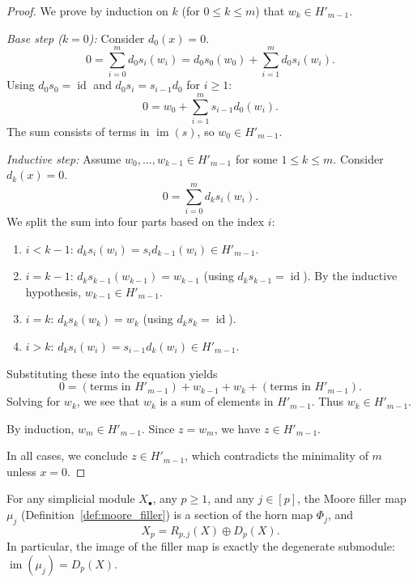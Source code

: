 \begin{proof}
We prove by induction on $k$ (for $0 \le k \le m$) that $w_k \in H'_{m-1}$.

\emph{Base step ($k=0$):} Consider $d_0(x)=0$.
\[
0 = \sum_{i=0}^m d_0 s_i(w_i) = d_0 s_0(w_0) + \sum_{i=1}^m d_0 s_i(w_i).
\]
Using $d_0 s_0 = \operatorname{id}$ and $d_0 s_i = s_{i-1} d_0$ for $i \ge 1$:
\[
0 = w_0 + \sum_{i=1}^m s_{i-1} d_0(w_i).
\]
The sum consists of terms in $\operatorname{im}(s)$, so $w_0 \in H'_{m-1}$.

\emph{Inductive step:} Assume $w_0, \dots, w_{k-1} \in H'_{m-1}$ for some $1 \le k \le m$. Consider $d_k(x)=0$.
\[
0 = \sum_{i=0}^m d_k s_i(w_i).
\]
We split the sum into four parts based on the index $i$:
\begin{enumerate}
    \item $i < k-1$: $d_k s_i(w_i) = s_i d_{k-1}(w_i) \in H'_{m-1}$.
    \item $i = k-1$: $d_k s_{k-1}(w_{k-1}) = w_{k-1}$ (using $d_k s_{k-1} = \operatorname{id}$). By the inductive hypothesis, $w_{k-1} \in H'_{m-1}$.
    \item $i = k$: $d_k s_k(w_k) = w_k$ (using $d_k s_k = \operatorname{id}$).
    \item $i > k$: $d_k s_i(w_i) = s_{i-1} d_k(w_i) \in H'_{m-1}$.
\end{enumerate}
Substituting these into the equation yields
\[
0 = (\text{terms in } H'_{m-1}) + w_{k-1} + w_k + (\text{terms in } H'_{m-1}).
\]
Solving for $w_k$, we see that $w_k$ is a sum of elements in $H'_{m-1}$. Thus $w_k \in H'_{m-1}$.

By induction, $w_m \in H'_{m-1}$. Since $z=w_m$, we have $z \in H'_{m-1}$.

In all cases, we conclude $z \in H'_{m-1}$, which contradicts the minimality of $m$ unless $x=0$.
\end{proof}

\begin{theorem}\label{thm:decomp_p}
For any simplicial module $X_\bullet$, any $p\ge 1$, and any $j\in[p]$, the Moore filler map $\mu_j$ (Definition~\ref{def:moore_filler}) is a section of the horn map $\Phi_j$, and
\[
X_p = R_{p,j}(X) \oplus D_p(X).
\]
In particular, the image of the filler map is exactly the degenerate submodule: $\operatorname{im}(\mu_j) = D_p(X)$.
\end{theorem}

